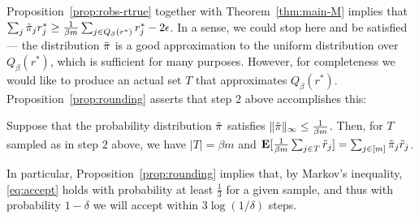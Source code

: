 Proposition~\ref{prop:robs-rtrue} together with Theorem~\ref{thm:main-M} 
implies that $\sum_j \tilde{\pi}_j r^*_j \geq \frac{1}{\beta m} \sum_{j \in Q_{\beta}(r^*)} r^*_j - 2\epsilon$. In a sense, we could stop here and be satisfied --- 
the distribution $\tilde{\pi}$ is a good approximation to the uniform distribution 
over $Q_{\beta}(r^*)$, which is sufficient for many purposes. However, for 
completeness we would like to produce an actual set $T$ that approximates 
$Q_{\beta}(r^*)$. Proposition~\ref{prop:rounding} asserts that step $2$ above 
accomplishes this:

\begin{proposition}
\label{prop:rounding}
Suppose that the probability distribution $\tilde{\pi}$ satisfies 
$\|\tilde{\pi}\|_{\infty} \leq \frac{1}{\beta m}$. Then, for $T$ sampled 
as in step $2$ above, we have $|T| = \beta m$ and $\mathbf{E}[\frac{1}{\beta m}\sum_{j \in T} \tilde{r}_j] = \sum_{j \in [m]} \tilde{\pi}_j \tilde{r}_j$.
\end{proposition}
In particular, Proposition~\ref{prop:rounding} implies that, by 
Markov's inequality, \eqref{eq:accept} holds with probability at least 
$\frac{1}{3}$ for a given sample, and thus with probability 
$1-\delta$ we will accept within $3\log(1/\delta)$ steps.



